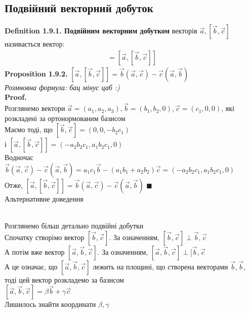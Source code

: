 \documentclass[a4paper, 14pt]{extarticle}
\def\defin#1{\textbf{Definition {#1}}}
\def\prp#1{\textbf{Proposition {#1}}}
\def\proof{\textbf{Proof.}\\}
\def\bigline{\vspace{5mm}\\}
\def\qed{$\blacksquare$}
\begin{document}
\subsection{Подвійний векторний добуток}
\defin{1.9.1. Подвійним векторним добутком} векторів $\vec{a}, [\vec{b},\vec{c}]$ називається вектор:
\begin{align*}
[\vec{a},\vec{b},\vec{c}] = [\vec{a},[\vec{b},\vec{c}]]
\end{align*}
\prp{1.9.2.} $[\vec{a},[\vec{b},\vec{c}]] = \vec{b} (\vec{a}, \vec{c}) - \vec{c} (\vec{a}, \vec{b})$\\
\textit{Розмновна формула: бац мінус цаб :)}\\
\proof
Розглянемо вектори $\vec{a} = (a_1, a_2, a_3), \vec{b} = (b_1,b_2,0), \vec{c} = (c_1,0,0)$, які розкладені за ортонормованим базисом\\
Маємо тоді, що $[\vec{b}, \vec{c}] = (0,0,-b_2 c_1)$\\
і $[\vec{a}, [\vec{b}, \vec{c}]] = (-a_2b_2c_1, a_1b_2c_1,0)$\\
Водночас $\vec{b} (\vec{a}, \vec{c}) - \vec{c} (\vec{a}, \vec{b}) = a_1c_1\vec{b} - (a_1b_1+a_2b_2)\vec{c} = (-a_2b_2c_1,a_1b_2c_1,0)$\\
Отже, $[\vec{a},[\vec{b},\vec{c}]] = \vec{b} (\vec{a}, \vec{c}) - \vec{c} (\vec{a}, \vec{b})$ \qed
\bigline
Альтернативне доведення\\
\\
Розглянемо більш детально подвійні добутки\\
Спочатку створімо вектор $[\vec{b}, \vec{c}]$. За означенням, $[\vec{b}, \vec{c}] \perp \vec{b},\vec{c}$\\
А потім вже вектор $[\vec{a},\vec{b},\vec{c}]$. За означенням, $[\vec{a},\vec{b},\vec{c}] \perp [\vec{b}, \vec{c}$\\
А це означає, що $[\vec{a},\vec{b},\vec{c}]$ лежить на площині, що створена векторами $\vec{b},\vec{b}$, тоді цей вектор розкладемо за базисом\\
$[\vec{a}, \vec{b}, \vec{c}] = \beta \vec{b} + \gamma \vec{c}$\\
Лишилось знайти координати $\beta, \gamma$\\
\end{document}
